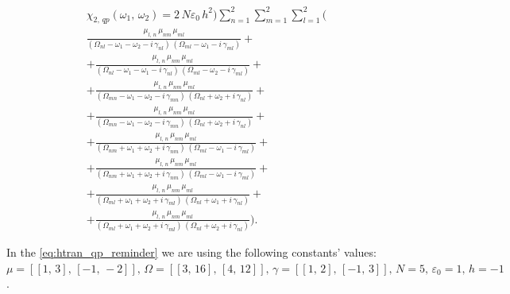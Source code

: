 \documentclass[12pt,twoside,a4paper]{article}
\numberwithin{equation}{subsection}
\numberwithin{figure}{subsection}
\begin{document}
\begin{multline} \label{eq:htran_qp_reminder}
  {\chi_{2, \,qp}}({\omega_{1}}, \,{\omega_{2}}) = 
  2 \, N { \varepsilon_{0}}\,h^{2}) \sum_{n=1}^{2} \sum_{m=1}^{2} \sum_{l=1}^{2} 
  (\\ \frac {{\mu_{l, \,n}}\,{\mu_{nm}}\,{\mu_{ml}}}
      {({\Omega_{nl}} - \omega_1 - \omega_2 - i\,{\gamma_{nl}})\,({\Omega_{ml}} - \omega_1 - i\,{\gamma_{ml}})}
  +\\ + \frac {{\mu_{l, \,n}}\,{\mu_{nm}}\,{\mu_{ml}}}
      {({\Omega_{nl}} - \omega_1 - \omega_1 - i\,{\gamma_{nl}})\,({\Omega_{ml}} - \omega_2 - i\,{\gamma_{ml}})} 
  +\\ + \frac {{\mu_{l, \,n}}\,{\mu_{nm}} \,{\mu_{ml}}}
      {({\Omega_{mn}} - \omega_1 - \omega_2 - i\,{\gamma_{mn}})\,({\Omega_{nl}} + \omega_2 + i\,{\gamma_{nl}})} 
  +\\ + \frac {{\mu_{l, \,n}}\,{\mu_{nm}}\,{\mu_{ml}}}
      {({\Omega_{mn}} - \omega_1 - \omega_2 - i\,{\gamma_{mn}})\,({\Omega_{nl}} + \omega_2 + i\,{\gamma_{nl}})} 
  +\\ + \frac {{\mu_{l, \,n}}\,{\mu_{nm}}\,{\mu_{ml}}}
      {({\Omega_{nm}} + \omega_1 + \omega_2 + i\,{\gamma_{nm}})\,({\Omega_{ml}} - \omega_1 - i\,{\gamma_{ml}})} 
  +\\ + \frac {{\mu_{l, \,n}}\,{\mu_{nm}}\,{\mu_{ml}}}
      {({\Omega_{nm}} + \omega_1 + \omega_2 + i\,{\gamma_{nm}})\,({\Omega_{ml}} - \omega_1 - i\,{\gamma_{ml}})} 
  +\\ + \frac {{\mu_{l, \,n}}\,{\mu_{nm}}\,{\mu_{ml}}}
      {({\Omega_{ml}} + \omega_1 + \omega_2 + i\,{\gamma_{ml}})\,({\Omega_{nl}} + \omega_1 + i\,{\gamma_{nl}})} 
  +\\ + \frac {{\mu_{l, \,n}}\,{\mu_{nm}}\,{\mu_{ml}}}
      {({\Omega_{ml}} + \omega_1 + \omega_2 + i\,{\gamma_{ml}})\,({\Omega_{nl}} + \omega_2 + i\,{\gamma_{nl}})}
  ) .
\end{multline} 

In the \ref{eq:htran_qp_reminder} we are using the following constants' values:
$\mu=[[1,\,3],\,[-1,\,-2]],\,\Omega=[[3,\,16],\,[4,\,12]],\,\gamma=[[1,\,2],\,[-1,\,3]],\,N=5,\,\varepsilon_{0}=1,\,h=-1$.
\end{document}
